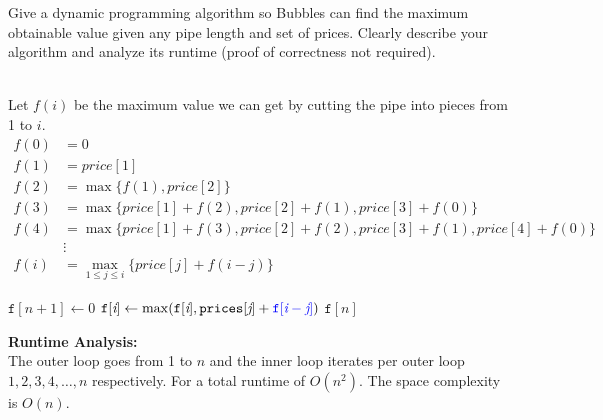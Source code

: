 \documentclass[11pt]{article}
\begin{document}
Give a dynamic programming algorithm so Bubbles can find the maximum obtainable value given any pipe length and set of prices.  Clearly describe your algorithm and analyze its runtime (proof of correctness not required).\\
\begin{solution}\\
    Let $f(i)$ be the maximum value we can get by cutting the pipe into pieces from 1 to $i$.
    \begin{align*}
        f(0) &= 0\\
        f(1) &= price[1]\\
        f(2) &= \max\{f(1), price[2]\}\\
        f(3) &= \max\{price[1] + f(2), price[2] + f(1), price[3] + f(0)\}\\
        f(4) &= \max\{price[1] + f(3), price[2] + f(2), price[3] + f(1), price[4] + f(0)\}\\
        &\vdots\\
        f(i) &= \max_{1\le j \le i}\{price[j] + f(i-j)\}
    \end{align*}
    \begin{algorithm}
        \color{blue}
        \caption{\color{blue}{}}
        \begin{algorithmic}[1]
                \State ${\texttt{f}[\textit{n}+1]} \gets 0$ 
                        \State ${\texttt{f}[\textit{i}]} \gets \max({\texttt{f}[\textit{i}]}, {\texttt{prices}[\textit{j}]} + \textcolor{blue}{\texttt{f}[\textit{i}-\textit{j}]})$ 
                    \EndFor
                \EndFor
                \State \Return ${\texttt{f}[\textit{n}]}$
            \EndFunction
        \end{algorithmic}
    \end{algorithm}
    \newline
    \textbf{Runtime Analysis: }\\
    The outer loop goes from 1 to $n$ and the inner loop iterates per outer loop
    $1, 2, 3, 4, \dots, n$ respectively. For a total runtime of $O(n^2)$. The space complexity is $O(n)$.
\end{solution}
\newpage
\end{document}

